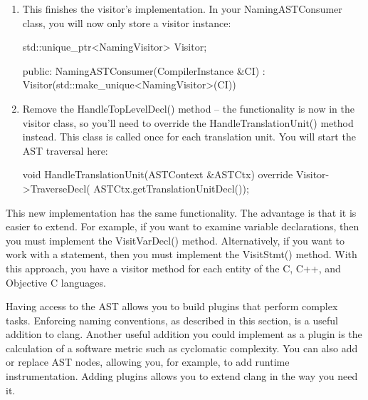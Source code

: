 \begin{enumerate}
\item
This finishes the visitor’s implementation. In your NamingASTConsumer class, you will now only store a visitor instance:

\begin{cpp}
    std::unique_ptr<NamingVisitor> Visitor;

public:
    NamingASTConsumer(CompilerInstance &CI)
        : Visitor(std::make_unique<NamingVisitor>(CI)) {}
\end{cpp}

\item
Remove the HandleTopLevelDecl() method – the functionality is now in the visitor class, so you’ll need to override the HandleTranslationUnit() method instead. This class is called once for each translation unit. You will start the AST traversal here:

\begin{cpp}
    void
    HandleTranslationUnit(ASTContext &ASTCtx) override {
        Visitor->TraverseDecl(
            ASTCtx.getTranslationUnitDecl());
    }
\end{cpp}

\end{enumerate}

This new implementation has the same functionality. The advantage is that it is easier to extend. For example, if you want to examine variable declarations, then you must implement the VisitVarDecl() method. Alternatively, if you want to work with a statement, then you must implement the VisitStmt() method. With this approach, you have a visitor method for each entity of the C, C++, and Objective C languages.

Having access to the AST allows you to build plugins that perform complex tasks. Enforcing naming conventions, as described in this section, is a useful addition to clang. Another useful addition you could implement as a plugin is the calculation of a software metric such as cyclomatic complexity.
You can also add or replace AST nodes, allowing you, for example, to add runtime instrumentation. Adding plugins allows you to extend clang in the way you need it.





























